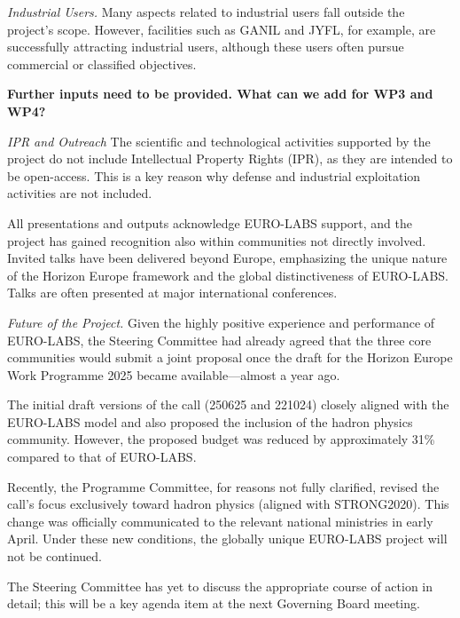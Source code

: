 {\it Industrial Users.}
Many aspects related to industrial users fall outside the project's scope. However, facilities such as GANIL and JYFL, for example, are successfully attracting industrial users, although these users often pursue commercial or classified objectives.

 \textbf{Further inputs need to be provided. What can we add for WP3 and WP4?}

{\it IPR and Outreach}
The scientific and technological activities supported by the project do not include Intellectual Property Rights (IPR), as they are intended to be open-access. This is a key reason why defense and industrial exploitation activities are not included.

All presentations and outputs acknowledge EURO-LABS support, and the project has gained recognition also within communities not directly involved. Invited talks have been delivered beyond Europe, emphasizing the unique nature of the Horizon Europe framework and the global distinctiveness of EURO-LABS. Talks are often presented at major international conferences.

{\it Future of the Project.}
Given the highly positive experience and performance of EURO-LABS, the Steering Committee had already agreed that the three core communities would submit a joint proposal once the draft for the Horizon Europe Work Programme 2025 became available—almost a year ago.

The initial draft versions of the call (250625 and 221024) closely aligned with the EURO-LABS model and also proposed the inclusion of the hadron physics community. However, the proposed budget was reduced by approximately 31\% compared to that of EURO-LABS.

Recently, the Programme Committee, for reasons not fully clarified, revised the call's focus exclusively toward hadron physics (aligned with STRONG2020). This change was officially communicated to the relevant national ministries in early April. Under these new conditions, the globally unique EURO-LABS project will not be continued.

The Steering Committee has yet to discuss the appropriate course of action in detail; this will be a key agenda item at the next Governing Board meeting.


